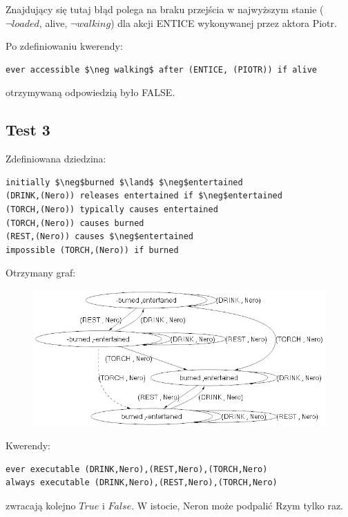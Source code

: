 \documentclass{article}
\begin{document}
Znajdujący się tutaj błąd polega na braku przejścia w najwyższym stanie ($\neg loaded$, alive, $\neg walking$) dla akcji ENTICE wykonywanej przez aktora Piotr.

Po zdefiniowaniu kwerendy:
\begin{lstlisting}[mathescape=true]
ever accessible $\neg walking$ after (ENTICE, (PIOTR)) if alive
\end{lstlisting}

otrzymywaną odpowiedzią było FALSE.

\newpage

\subsection{Test 3}
Zdefiniowana dziedzina:
\bigskip
{}
\begin{lstlisting}[mathescape=true]
initially $\neg$burned $\land$ $\neg$entertained
(DRINK,(Nero)) releases entertained if $\neg$entertained
(TORCH,(Nero)) typically causes entertained
(TORCH,(Nero)) causes burned
(REST,(Nero)) causes $\neg$entertained
impossible (TORCH,(Nero)) if burned
\end{lstlisting}
\vspace{1cm}

Otrzymany graf:
\begin{figure}[H]
	\centering
	\includegraphics[scale=0.6]{test3_graf}
\end{figure}

Kwerendy:
\begin{lstlisting}[mathescape=true]
ever executable (DRINK,Nero),(REST,Nero),(TORCH,Nero)
always executable (DRINK,Nero),(REST,Nero),(TORCH,Nero)
\end{lstlisting}
zwracają kolejno $True$ i $False$. W istocie, Neron może podpalić Rzym tylko raz.
\vspace{0.2cm}
\end{document}
